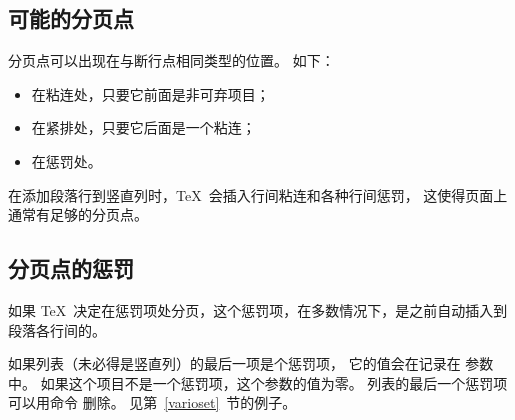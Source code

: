 \documentclass{book}
\begin{document}
\subsection{可能的分页点}

分页点可以出现在与断行点相同类型的位置。
如下：
\begin{itemize}
\item 在粘连处，只要它前面是非可弃项目；
\item 在紧排处，只要它后面是一个粘连；
\item 在惩罚处。
\end{itemize}
在添加段落行到竖直列时，\TeX\ 会插入行间粘连和各种行间惩罚，
这使得页面上通常有足够的分页点。

\subsection{分页点的惩罚}

如果 \TeX\ 决定在惩罚项处分页，这个惩罚项，在多数情况下，是之前自动插入到段落各行间的。

如果列表（未必得是竖直列）的最后一项是个惩罚项，
\alt
它的值会在记录在  参数中。
如果这个项目不是一个惩罚项，这个参数的值为零。
列表的最后一个惩罚项可以用命令  删除。
见第~\ref{varioset}~节的例子。
\end{document}
